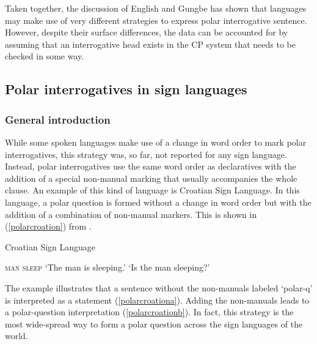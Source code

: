 Taken together, the discussion of English and Gungbe has shown that languages may make use of very different strategies to express polar interrogative sentence. However, despite their surface differences, the data can be accounted for by assuming that an interrogative head exists in the CP system that needs to be checked in some way.

\subsection{Polar interrogatives in sign languages}\label{polarintsign}



\subsubsection{General introduction}
While some spoken languages make use of a change in word order to mark polar interrogatives, this strategy was, so far, not reported for any sign language. Instead, polar interrogatives use the same word order as declaratives with the addition of a special non-manual marking that usually accompanies the whole clause. An example of this kind of language is Croatian Sign Language. In this language, a polar question is formed without a change in word order but with the addition of a combination of non-manual markers. This is shown in (\ref{polarcroation}) from \citet[157]{sarac2006interrogative}.

\begin{exe}
\ex Croatian Sign Language\label{polarcroation}\begin{xlist}
\ex \textsc{man sleep}
\glt `The man is sleeping.' \label{polarcroationa}
\ex {}
\glt `Is the man sleeping?' \label{polarcroationb}
\end{xlist}
\end{exe}


\noindent The example illustrates that a sentence without the non-manuals labeled `polar-q' is interpreted as a statement (\ref{polarcroationa}). Adding the non-manuals leads to a polar-question interpretation (\ref{polarcroationb}). In fact, this strategy is the most wide-spread way to form a polar question across the sign languages of the world.

